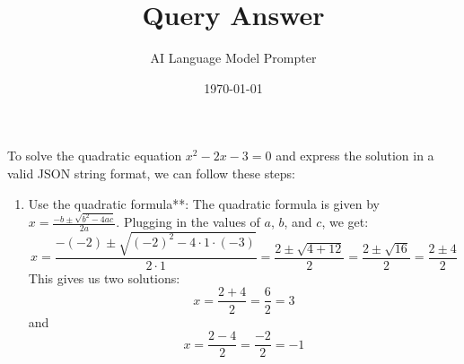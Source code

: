 \documentclass{article}
\title{Query Answer}
\author{AI Language Model Prompter}
\date{\today}
\begin{document}
\maketitle

To solve the quadratic equation \(x^2 - 2x - 3 = 0\) and express the solution in a valid JSON string format, we can follow these steps:

\begin{enumerate}
\item Use the quadratic formula**: The quadratic formula is given by \(x = \frac{-b \pm \sqrt{b^2 - 4ac}}{2a}\). Plugging in the values of \(a\), \(b\), and \(c\), we get:
   \[
   x = \frac{-(-2) \pm \sqrt{(-2)^2 - 4 \cdot 1 \cdot (-3)}}{2 \cdot 1} = \frac{2 \pm \sqrt{4 + 12}}{2} = \frac{2 \pm \sqrt{16}}{2} = \frac{2 \pm 4}{2}
   \]
   This gives us two solutions:
   \[
   x = \frac{2 + 4}{2} = \frac{6}{2} = 3
   \]
   and
   \[
   x = \frac{2 - 4}{2} = \frac{-2}{2} = -1
   \]
\end{enumerate}
\end{document}
